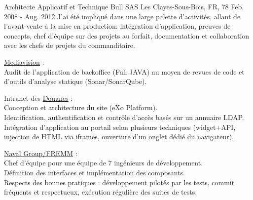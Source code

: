 \begin{cventries}
  \cventry
    {Architecte Applicatif et Technique} %
    {Bull SAS} %
    {Les Clayes-Sous-Bois, FR, 78} %
    {Feb. 2008 - Aug. 2012} %
{
J'ai été impliqué dans une large palette d'activités, allant de l'avant-vente à la mise en production: intégration d'application, preuves de concepts, chef d'équipe sur des projets au forfait, documentation et collaboration avec les chefs de projets du commanditaire.
} %
{
      \begin{cvitems} %
        \item {\href{http://www.mediavision.fr}{Mediavision} :\\Audit de l'application de backoffice (Full JAVA) au moyen de revues de code et d'outils d'analyse statique (Sonar/SonarQube).}
        \item Intranet des {\href{http://www.douane.gouv.fr}{Douanes} :\\Conception et architecture du site (eXo Platform).\\Identification, authentification et contrôle d'accès basés sur un annuaire LDAP.\\Intégration d'application au portail selon plusieurs techniques (widget+API, injection de HTML via iframes, ouverture d'un onglet dédié du navigateur).}
        \item {\href{https://www.naval-group.com/en/news/dcns-delivers-multi-mission-frigate-auvergne-the-fourth-fremm-for-the-french-navy/}{Naval Group/FREMM} :\\Chef d'équipe pour une équipe de 7 ingénieurs de développement.\\Définition des interfaces et implémentation des composants.\\Respects des bonnes pratiques : développement pilotés par les tests, commit fréquents et respectueux, exécution régulière des suites de tests.}
      \end{cvitems}
} %


\end{cventries}
